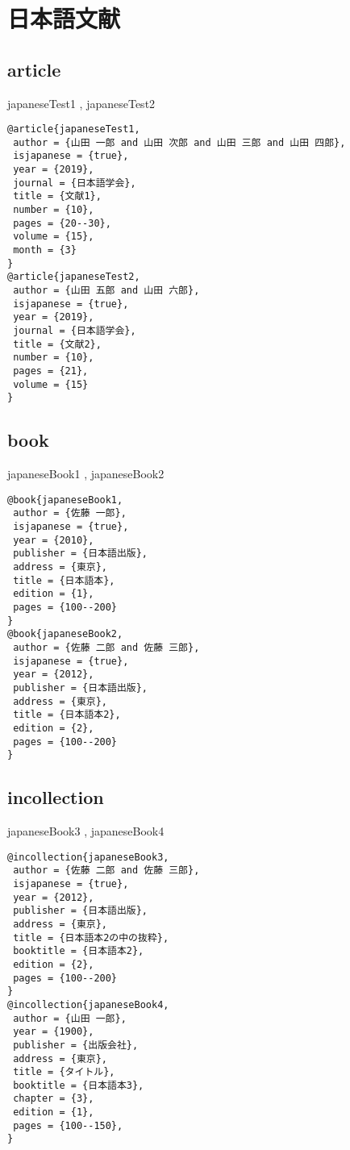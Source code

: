 \documentclass[10pt,a4paper]{article}
\author{JPandENbst}
\begin{document}
\section{日本語文献}
\subsection{article\\}
japaneseTest1 \cite{japaneseTest1}, 
japaneseTest2 \cite{japaneseTest2}

\begin{lstlisting}
@article{japaneseTest1,
 author = {山田 一郎 and 山田 次郎 and 山田 三郎 and 山田 四郎},
 isjapanese = {true},
 year = {2019},
 journal = {日本語学会},
 title = {文献1},
 number = {10},
 pages = {20--30},
 volume = {15},
 month = {3}
}
@article{japaneseTest2,
 author = {山田 五郎 and 山田 六郎},
 isjapanese = {true},
 year = {2019},
 journal = {日本語学会},
 title = {文献2},
 number = {10},
 pages = {21},
 volume = {15}
}
\end{lstlisting}

\subsection{book\\}
japaneseBook1 \cite{japaneseBook1}, 
japaneseBook2 \cite{japaneseBook2}

\begin{lstlisting}
@book{japaneseBook1,
 author = {佐藤 一郎},
 isjapanese = {true},
 year = {2010},
 publisher = {日本語出版},
 address = {東京},
 title = {日本語本},
 edition = {1},
 pages = {100--200}
}
@book{japaneseBook2,
 author = {佐藤 二郎 and 佐藤 三郎},
 isjapanese = {true},
 year = {2012},
 publisher = {日本語出版},
 address = {東京},
 title = {日本語本2},
 edition = {2},
 pages = {100--200}
}
\end{lstlisting}

\subsection{incollection\\}
japaneseBook3 \cite{japaneseBook3}, 
japaneseBook4 \cite{japaneseBook4}

\begin{lstlisting}
@incollection{japaneseBook3,
 author = {佐藤 二郎 and 佐藤 三郎},
 isjapanese = {true},
 year = {2012},
 publisher = {日本語出版},
 address = {東京},
 title = {日本語本2の中の抜粋},
 booktitle = {日本語本2},
 edition = {2},
 pages = {100--200}
}
@incollection{japaneseBook4,
 author = {山田 一郎},
 year = {1900},
 publisher = {出版会社},
 address = {東京},
 title = {タイトル},
 booktitle = {日本語本3},
 chapter = {3},
 edition = {1},
 pages = {100--150},
}
\end{lstlisting}
\end{document}
